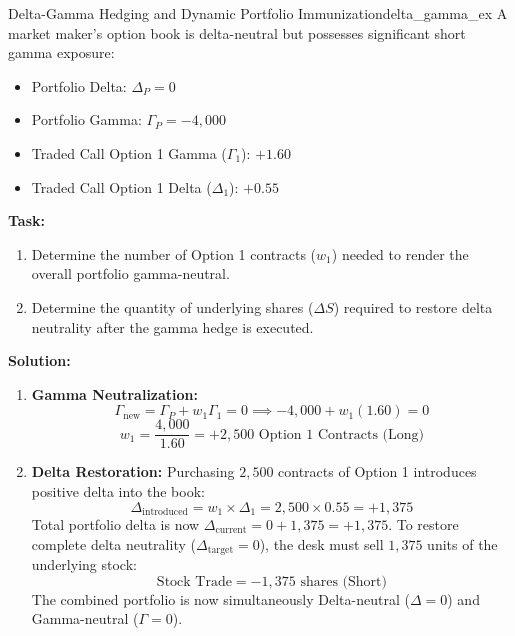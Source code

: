 \begin{example}{Delta-Gamma Hedging and Dynamic Portfolio Immunization}{delta_gamma_ex}
A market maker's option book is delta-neutral but possesses significant short gamma exposure:
\begin{itemize}[leftmargin=1.5em, noitemsep]
    \item Portfolio Delta: $\Delta_P = 0$
    \item Portfolio Gamma: $\Gamma_P = -4,000$
    \item Traded Call Option 1 Gamma ($\Gamma_1$): $+1.60$
    \item Traded Call Option 1 Delta ($\Delta_1$): $+0.55$
\end{itemize}

\textbf{Task:}
\begin{enumerate}[leftmargin=1.2em, itemsep=2pt]
    \item Determine the number of Option 1 contracts ($w_1$) needed to render the overall portfolio gamma-neutral.
    \item Determine the quantity of underlying shares ($\Delta S$) required to restore delta neutrality after the gamma hedge is executed.
\end{enumerate}

\textbf{Solution:}
\begin{enumerate}[leftmargin=1.2em, itemsep=2pt]
    \item \textbf{Gamma Neutralization:}
    \[
    \Gamma_{\text{new}} = \Gamma_P + w_1 \Gamma_1 = 0 \implies -4,000 + w_1 (1.60) = 0
    \]
    \[
    w_1 = \frac{4,000}{1.60} = +2,500 \text{ Option 1 Contracts (Long)}
    \]
    \item \textbf{Delta Restoration:}
    Purchasing $2,500$ contracts of Option 1 introduces positive delta into the book:
    \[
    \Delta_{\text{introduced}} = w_1 \times \Delta_1 = 2,500 \times 0.55 = +1,375
    \]
    Total portfolio delta is now $\Delta_{\text{current}} = 0 + 1,375 = +1,375$.
    To restore complete delta neutrality ($\Delta_{\text{target}} = 0$), the desk must sell $1,375$ units of the underlying stock:
    \[
    \text{Stock Trade} = -1,375 \text{ shares (Short)}
    \]
    The combined portfolio is now simultaneously Delta-neutral ($\Delta = 0$) and Gamma-neutral ($\Gamma = 0$).
\end{enumerate}
\end{example}
